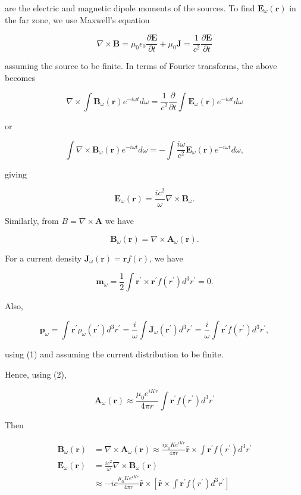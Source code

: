 \documentclass[10pt]{article}
\begin{document}
are the electric and magnetic dipole moments of the sources. To find $\mathbf{E}_{\omega}(\mathbf{r})$ in the far zone, we use Maxwell's equation

$$
\nabla \times \mathbf{B}=\mu_{0} \epsilon_{0} \frac{\partial \mathbf{E}}{\partial t}+\mu_{0} \mathbf{J}=\frac{1}{c^{2}} \frac{\partial \mathbf{E}}{\partial t}
$$

assuming the source to be finite. In terms of Fourier transforms, the above becomes

$$
\nabla \times \int \mathbf{B}_{\omega}(\mathbf{r}) e^{-i \omega t} d \omega=\frac{1}{c^{2}} \frac{\partial}{\partial t} \int \mathbf{E}_{\omega}(\mathbf{r}) e^{-i \omega t} d \omega
$$

or

$$
\int \nabla \times \mathbf{B}_{\omega}(\mathbf{r}) e^{-i \omega t} d \omega=-\int \frac{i \omega}{c^{2}} \mathbf{E}_{\omega}(\mathbf{r}) e^{-i \omega t} d \omega,
$$

giving

$$
\mathbf{E}_{\omega}(\mathbf{r})=\frac{i c^{2}}{\omega} \nabla \times \mathbf{B}_{\omega} .
$$

Similarly, from $B=\nabla \times \mathbf{A}$ we have

$$
\mathbf{B}_{\omega}(\mathbf{r})=\nabla \times \mathbf{A}_{\omega}(\mathbf{r}) .
$$

For a current density $\mathbf{J}_{\omega}(\mathbf{r})=\mathbf{r} f(r)$, we have

$$
\mathbf{m}_{\omega}=\frac{1}{2} \int \mathbf{r}^{\prime} \times \mathbf{r}^{\prime} f\left(r^{\prime}\right) d^{3} r^{\prime}=0 .
$$

Also,

$$
\mathbf{p}_{\omega}=\int \mathbf{r}^{\prime} \rho_{\omega}\left(\mathbf{r}^{\prime}\right) d^{3} r^{\prime}=\frac{i}{\omega} \int \mathbf{J}_{\omega}\left(\mathbf{r}^{\prime}\right) d^{3} r^{\prime}=\frac{i}{\omega} \int \mathbf{r}^{\prime} f\left(r^{\prime}\right) d^{3} r^{\prime},
$$

using (1) and assuming the current distribution to be finite.

Hence, using (2),

$$
\mathbf{A}_{\omega}(\mathbf{r}) \approx \frac{\mu_{0} e^{i K r}}{4 \pi r} \int \mathbf{r}^{\prime} f\left(r^{\prime}\right) d^{3} r^{\prime}
$$

Then

$$
\begin{aligned}
\mathbf{B}_{\omega}(\mathbf{r}) &=\nabla \times \mathbf{A}_{\omega}(\mathbf{r}) \approx \frac{i \mu_{0} K e^{i K r}}{4 \pi r} \hat{\mathbf{r}} \times \int \mathbf{r}^{\prime} f\left(r^{\prime}\right) d^{3} r^{\prime} \\
\mathbf{E}_{\omega}(\mathbf{r}) &=\frac{i c^{2}}{\omega} \nabla \times \mathbf{B}_{\omega}(\mathbf{r}) \\
& \approx-i c \frac{\mu_{0} K e^{i K r}}{4 \pi r} \hat{\mathbf{r}} \times\left[\hat{\mathbf{r}} \times \int \mathbf{r}^{\prime} f\left(r^{\prime}\right) d^{3} r^{\prime}\right]
\end{aligned}
$$
\end{document}
